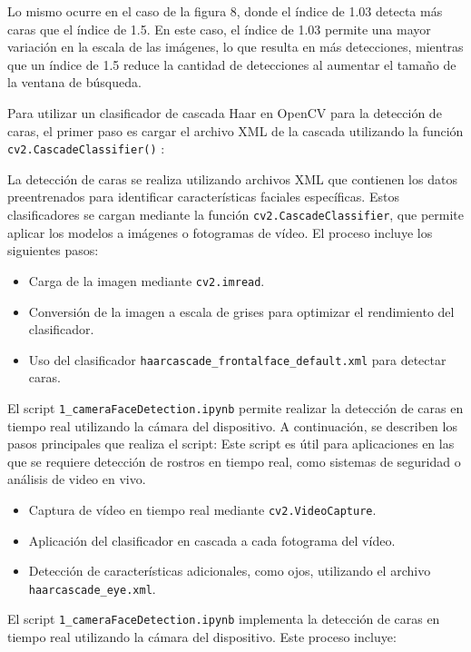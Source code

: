 \documentclass[a4paper]{article}
\begin{document}
Lo mismo ocurre en el caso de la figura 8, donde el índice de 1.03 detecta más caras que el índice de 1.5. En este caso, el índice de 1.03 permite una mayor variación en la escala de las imágenes, lo que resulta en más detecciones, mientras que un índice de 1.5 reduce la cantidad de detecciones al aumentar el tamaño de la ventana de búsqueda.

Para utilizar un clasificador de cascada Haar en OpenCV para la detección de caras, el primer paso es cargar el archivo XML de la cascada utilizando la función \texttt{cv2.CascadeClassifier()} :

La detección de caras se realiza utilizando archivos XML que contienen los datos preentrenados para identificar características faciales específicas. Estos clasificadores se cargan mediante la función \texttt{cv2.CascadeClassifier}, que permite aplicar los modelos a imágenes o fotogramas de vídeo.
El proceso incluye los siguientes pasos:

\begin{itemize}
    \item Carga de la imagen mediante \texttt{cv2.imread}.
    \item Conversión de la imagen a escala de grises para optimizar el rendimiento del clasificador.
    \item Uso del clasificador \texttt{haarcascade\_frontalface\_default.xml} para detectar caras.
\end{itemize}

El script \texttt{1\_cameraFaceDetection.ipynb} permite realizar la detección de caras en tiempo real utilizando la cámara del dispositivo. A continuación, se describen los pasos principales que realiza el script:
Este script es útil para aplicaciones en las que se requiere detección de rostros en tiempo real, como sistemas de seguridad o análisis de video en vivo.

\begin{itemize}
    \item Captura de vídeo en tiempo real mediante \texttt{cv2.VideoCapture}.
    \item Aplicación del clasificador en cascada a cada fotograma del vídeo.
    \item Detección de características adicionales, como ojos, utilizando el archivo \texttt{haarcascade\_eye.xml}.
\end{itemize}

El script \texttt{1\_cameraFaceDetection.ipynb} implementa la detección de caras en tiempo real utilizando la cámara del dispositivo. Este proceso incluye:
\end{document}
